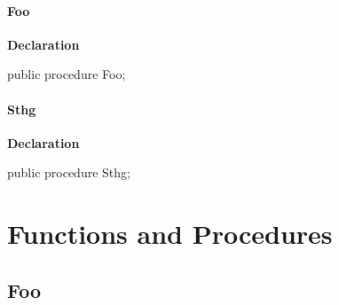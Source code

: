 \documentclass{report}
\newif\ifpdf
\begin{document}
\paragraph*{Foo}\hspace*{\fill}

\label{ok_link_class_unit_level.TBar-Foo}
\begin{list}{}{
\setlength{\itemindent}{0cm}
\setlength{\listparindent}{0cm}
\setlength{\leftmargin}{\evensidemargin}
\addtolength{\leftmargin}{\tmplength}
\settowidth{\labelsep}{X}
\addtolength{\leftmargin}{\labelsep}
\setlength{\labelwidth}{\tmplength}
}
\item[\textbf{Declaration}\hfill]
\ifpdf
\begin{flushleft}
\fi
\begin{ttfamily}
public procedure Foo;\end{ttfamily}

\ifpdf
\end{flushleft}
\fi

\end{list}
\paragraph*{Sthg}\hspace*{\fill}

\label{ok_link_class_unit_level.TBar-Sthg}
\begin{list}{}{
\setlength{\itemindent}{0cm}
\setlength{\listparindent}{0cm}
\setlength{\leftmargin}{\evensidemargin}
\addtolength{\leftmargin}{\tmplength}
\settowidth{\labelsep}{X}
\addtolength{\leftmargin}{\labelsep}
\setlength{\labelwidth}{\tmplength}
}
\item[\textbf{Declaration}\hfill]
\ifpdf
\begin{flushleft}
\fi
\begin{ttfamily}
public procedure Sthg;\end{ttfamily}

\ifpdf
\end{flushleft}
\fi

\end{list}
\section{Functions and Procedures}
\ifpdf
\subsection*{\large{\textbf{Foo}}\normalsize\hspace{1ex}\hrulefill}
\else
\end{document}

